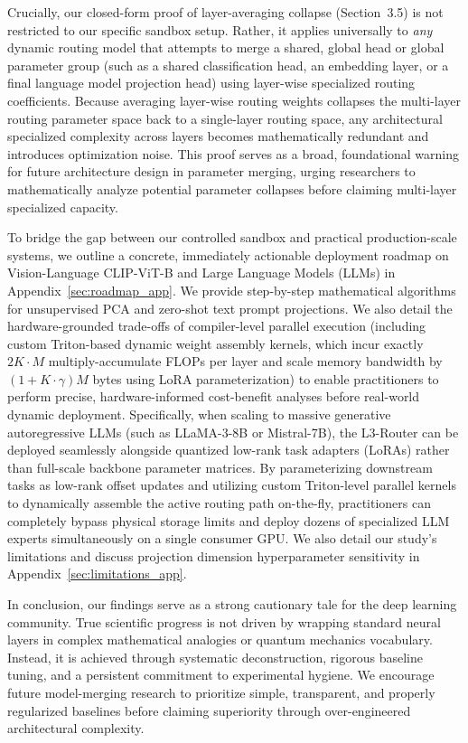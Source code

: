 Crucially, our closed-form proof of layer-averaging collapse (Section~3.5) is not restricted to our specific sandbox setup. Rather, it applies universally to \textit{any} dynamic routing model that attempts to merge a shared, global head or global parameter group (such as a shared classification head, an embedding layer, or a final language model projection head) using layer-wise specialized routing coefficients. Because averaging layer-wise routing weights collapses the multi-layer routing parameter space back to a single-layer routing space, any architectural specialized complexity across layers becomes mathematically redundant and introduces optimization noise. This proof serves as a broad, foundational warning for future architecture design in parameter merging, urging researchers to mathematically analyze potential parameter collapses before claiming multi-layer specialized capacity.

To bridge the gap between our controlled sandbox and practical production-scale systems, we outline a concrete, immediately actionable deployment roadmap on Vision-Language CLIP-ViT-B and Large Language Models (LLMs) in Appendix~\ref{sec:roadmap_app}. We provide step-by-step mathematical algorithms for unsupervised PCA and zero-shot text prompt projections. We also detail the hardware-grounded trade-offs of compiler-level parallel execution (including custom Triton-based dynamic weight assembly kernels, which incur exactly $2 K \cdot M$ multiply-accumulate FLOPs per layer and scale memory bandwidth by $(1 + K \cdot \gamma) M$ bytes using LoRA parameterization) to enable practitioners to perform precise, hardware-informed cost-benefit analyses before real-world dynamic deployment. Specifically, when scaling to massive generative autoregressive LLMs (such as LLaMA-3-8B or Mistral-7B), the L3-Router can be deployed seamlessly alongside quantized low-rank task adapters (LoRAs) rather than full-scale backbone parameter matrices. By parameterizing downstream tasks as low-rank offset updates and utilizing custom Triton-level parallel kernels to dynamically assemble the active routing path on-the-fly, practitioners can completely bypass physical storage limits and deploy dozens of specialized LLM experts simultaneously on a single consumer GPU. We also detail our study's limitations and discuss projection dimension hyperparameter sensitivity in Appendix~\ref{sec:limitations_app}.

In conclusion, our findings serve as a strong cautionary tale for the deep learning community. True scientific progress is not driven by wrapping standard neural layers in complex mathematical analogies or quantum mechanics vocabulary. Instead, it is achieved through systematic deconstruction, rigorous baseline tuning, and a persistent commitment to experimental hygiene. We encourage future model-merging research to prioritize simple, transparent, and properly regularized baselines before claiming superiority through over-engineered architectural complexity.
